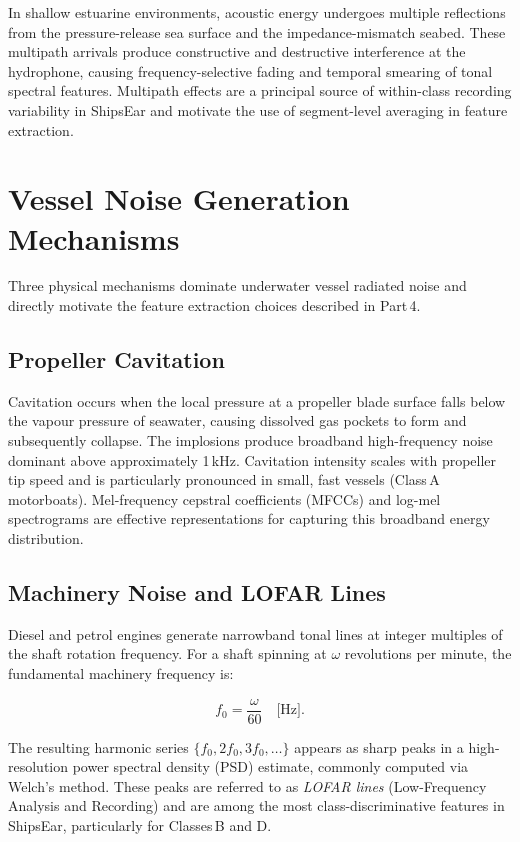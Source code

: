\documentclass[conference]{IEEEtran}
\begin{document}
In shallow estuarine environments, acoustic energy undergoes multiple
reflections from the pressure-release sea surface and the impedance-mismatch
seabed. These multipath arrivals produce constructive and destructive
interference at the hydrophone, causing frequency-selective fading and
temporal smearing of tonal spectral features. Multipath effects are a
principal source of within-class recording variability in ShipsEar and
motivate the use of segment-level averaging in feature extraction.

% 
\section{Vessel Noise Generation Mechanisms}

Three physical mechanisms dominate underwater vessel radiated noise and
directly motivate the feature extraction choices described in Part\,4.

\subsection{Propeller Cavitation}

Cavitation occurs when the local pressure at a propeller blade surface falls
below the vapour pressure of seawater, causing dissolved gas pockets to form
and subsequently collapse. The implosions produce broadband high-frequency
noise dominant above approximately 1\,kHz. Cavitation intensity scales with
propeller tip speed and is particularly pronounced in small, fast vessels
(Class\,A motorboats). Mel-frequency cepstral coefficients (MFCCs) and
log-mel spectrograms are effective representations for capturing this
broadband energy distribution.

\subsection{Machinery Noise and LOFAR Lines}

Diesel and petrol engines generate narrowband tonal lines at integer multiples
of the shaft rotation frequency. For a shaft spinning at $\omega$ revolutions
per minute, the fundamental machinery frequency is:

\begin{equation}
  f_0 = \frac{\omega}{60} \quad \text{[Hz].}
  \label{eq:lofar_fundamental}
\end{equation}

The resulting harmonic series $\{f_0, 2f_0, 3f_0, \ldots\}$ appears as sharp
peaks in a high-resolution power spectral density (PSD) estimate, commonly
computed via Welch's method. These peaks are referred to as \textit{LOFAR
lines} (Low-Frequency Analysis and Recording) and are among the most
class-discriminative features in ShipsEar, particularly for Classes\,B and D.
\end{document}
